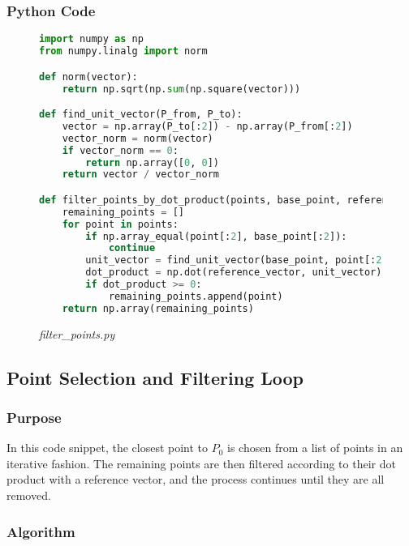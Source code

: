\documentclass[12pt,a4paper]{report}
\begin{document}
\vspace*{\fill}\newpage

\subsubsection{Python Code}
\begin{figure}[ht!]
\centering
\caption*{\large\textit{filter\_points.py}}
\begin{lstlisting}[language=Python, caption={Filtering Points by Dot Product}]
import numpy as np
from numpy.linalg import norm

def norm(vector):
    return np.sqrt(np.sum(np.square(vector)))

def find_unit_vector(P_from, P_to):
    vector = np.array(P_to[:2]) - np.array(P_from[:2])
    vector_norm = norm(vector)
    if vector_norm == 0:
        return np.array([0, 0])
    return vector / vector_norm

def filter_points_by_dot_product(points, base_point, reference_vector):
    remaining_points = []
    for point in points:
        if np.array_equal(point[:2], base_point[:2]):
            continue
        unit_vector = find_unit_vector(base_point, point[:2])
        dot_product = np.dot(reference_vector, unit_vector)
        if dot_product >= 0:
            remaining_points.append(point)
    return np.array(remaining_points)
\end{lstlisting}
\end{figure}


\subsection{Point Selection and Filtering Loop}

\subsubsection{Purpose}
In this code snippet, the closest point to \(P_0\) is chosen from a list of points in an iterative fashion. The remaining points are then filtered according to their dot product with a reference vector, and the process continues until they are all removed.

\vspace*{\fill}\newpage
\subsubsection{Algorithm}
\end{document}
